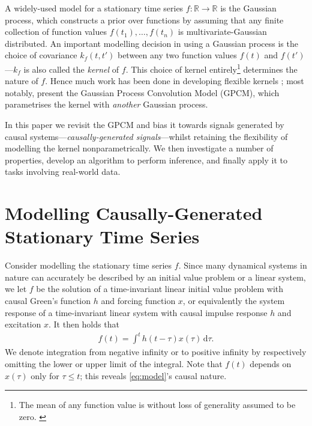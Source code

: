 \documentclass{article}
\newcommand{\R}{\mathbb{R}}   %
\newcommand{\id}[1]{\, \mathrm{d} #1}     %
\begin{document}
A widely-used model for a stationary time series $f:\R \to \R$ is the Gaussian process, which constructs a prior over functions by assuming that any finite collection of function values $f(t_1),\ldots,f(t_n)$ is multivariate-Gaussian distributed. An important modelling decision in using a Gaussian process is the choice of covariance   $k_f(t,t')$ between any two function values $f(t)$ and $f(t')$---$k_f$ is also called the \textit{kernel} of $f$. This choice of kernel entirely\footnote{The mean of any function value is without loss of generality assumed to be zero. \cite{Rasmussen:2006:Gaussian_Processes}} determines the nature of $f$. Hence much work has been done in developing flexible kernels \cite{Duvenaud:2014:Automatic_Construction,Wilson:2013:Spectral_Mixture,Tobar:2015:Learning_Stationary,Tobar:2015:Inter-Domain_Inducing}; most notably, \citet{Tobar:2015:Learning_Stationary} present the Gaussian Process Convolution Model (GPCM), which parametrises the kernel with \textit{another} Gaussian process.

In this paper we revisit the GPCM and bias it towards signals generated by causal systems---\textit{causally-generated signals}---whilst retaining the flexibility of modelling the kernel nonparametrically. We then investigate a number of properties, develop an algorithm to perform inference, and finally apply it to tasks involving real-world data.

\section{Modelling Causally-Generated Stationary Time Series}
Consider modelling the stationary time series $f$. Since many dynamical systems in nature can accurately be described by an initial value problem or a linear system, we let $f$ be the solution of a time-invariant linear initial value problem with causal Green's function $h$ and forcing function $x$, or equivalently the system response of a time-invariant linear system with causal impulse response $h$ and excitation $x$. It then holds that
\begin{align} \label{eq:model}
    f(t) = \int^t h(t- \tau)x(\tau)\id{\tau}.
\end{align}
We denote integration from negative infinity or to positive infinity by respectively omitting the lower or upper limit of the integral.
Note that $f(t)$ depends on $x(\tau)$ only for $\tau \le t$; this reveals \cref{eq:model}'s causal nature.
\end{document}
